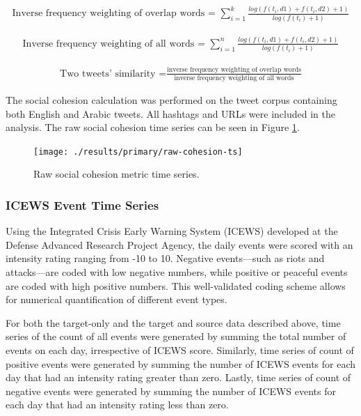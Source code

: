 \documentclass[english,man]{apa6}
\begin{document}
\begin{align}
\text{Inverse frequency weighting of overlap words = }\sum_{i=1}^k
\frac{log(f(t_i, d1) + f(t_i, d2) + 1)}{log(f(t_i) + 1)}
\end{align}

\begin{align}
\text{Inverse frequency weighting of all words = }\sum_{i=1}^n \frac{log(f(t_i,
d1) + f(t_i, d2) + 1)}{log(f(t_i) + 1)}
\end{align}

\begin{align}
\text{Two tweets' similarity =}\frac{\text{inverse frequency weighting of overlap
words}}{\text{inverse frequency weighting of all words}}
\end{align}

\noindent The social cohesion calculation was performed on the tweet corpus
containing both English and Arabic tweets. All hashtags and URLs were included
in the analysis. The raw social cohesion time series can be seen in Figure
\ref{fig:raw-cohesion-ts}.

\begin{figure}
\texttt{[image: ./results/primary/raw-cohesion-ts]} \caption{Raw social cohesion metric time series.}\label{fig:raw-cohesion-ts}
\end{figure}

\hypertarget{icews-event-time-series}{%
\subsubsection{ICEWS Event Time Series}\label{icews-event-time-series}}

Using the Integrated Crisis Early Warning System (ICEWS) developed at the
Defense Advanced Research Project Agency, the daily events were scored with an
intensity rating ranging from -10 to 10. Negative events---such as riots and
attacks---are coded with low negative numbers, while positive or peaceful events
are coded with high positive numbers. This well-validated coding scheme allows
for numerical quantification of different event types.

For both the target-only and the target and source data described above, time
series of the count of all events were generated by summing the total number of
events on each day, irrespective of ICEWS score. Similarly, time series of count
of positive events were generated by summing the number of ICEWS events for each
day that had an intensity rating greater than zero. Lastly, time series of count
of negative events were generated by summing the number of ICEWS events for each
day that had an intensity rating less than zero.
\end{document}
